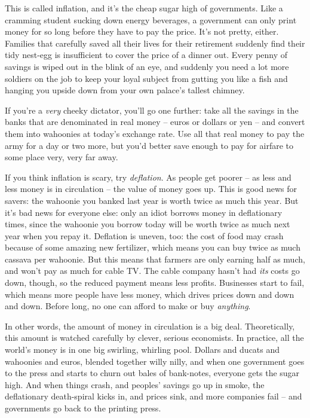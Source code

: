This is called inflation, and it's the cheap sugar high of
governments. Like a cramming student sucking down energy beverages,
a government can only print money for so long before they have to
pay the price. It's not pretty, either. Families that carefully
saved all their lives for their retirement suddenly find their tidy
nest-egg is insufficient to cover the price of a dinner out. Every
penny of savings is wiped out in the blink of an eye, and suddenly
you need a lot more soldiers on the job to keep your loyal subject
from gutting you like a fish and hanging you upside down from your
own palace's tallest chimney.

If you're a \emph{very} cheeky dictator, you'll go one further:
take all the savings in the banks that are denominated in real
money -- euros or dollars or yen -- and convert them into wahoonies
at today's exchange rate. Use all that real money to pay the army
for a day or two more, but you'd better save enough to pay for
airfare to some place very, very far away.

If you think inflation is scary, try \emph{deflation}. As people
get poorer -- as less and less money is in circulation -- the value
of money goes up. This is good news for savers: the wahoonie you
banked last year is worth twice as much this year. But it's bad
news for everyone else: only an idiot borrows money in deflationary
times, since the wahoonie you borrow today will be worth twice as
much next year when you repay it. Deflation is uneven, too: the
cost of food may crash because of some amazing new fertilizer,
which means you can buy twice as much cassava per wahoonie. But
this means that farmers are only earning half as much, and won't
pay as much for cable TV. The cable company hasn't had \emph{its}
costs go down, though, so the reduced payment means less profits.
Businesses start to fail, which means more people have less money,
which drives prices down and down and down. Before long, no one can
afford to make or buy \emph{anything}.

In other words, the amount of money in circulation is a big deal.
Theoretically, this amount is watched carefully by clever, serious
economists. In practice, all the world's money is in one big
swirling, whirling pool. Dollars and ducats and wahoonies and
euros, blended together willy nilly, and when one government goes
to the press and starts to churn out bales of bank-notes, everyone
gets the sugar high. And when things crash, and peoples' savings go
up in smoke, the deflationary death-spiral kicks in, and prices
sink, and more companies fail -- and governments go back to the
printing press.

